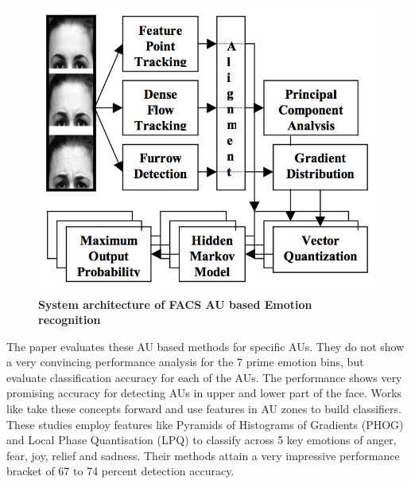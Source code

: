 \begin{figure}
\centering
\includegraphics[width=\columnwidth]{figures/FAU_Kanade}
\caption{\textbf{System architecture of FACS AU based Emotion recognition}}
\label{fig:FACSAU}
\end{figure}

The paper evaluates these AU based methods for specific AUs. They do not show a very convincing performance analysis for the 7 prime emotion bins, but evaluate classification accuracy for each of the AUs. The performance shows very promising accuracy for detecting AUs in upper and lower part of the face. Works like \cite{1027968} \cite{5771366} take these concepts forward and use features in AU zones to build classifiers. These studies employ features like Pyramids of Histograms of Gradients (PHOG) and Local Phase Quantisation (LPQ) to classify across 5 key emotions of anger, fear, joy, relief and sadness. Their methods attain a very impressive performance bracket of 67 to 74 percent detection accuracy.

